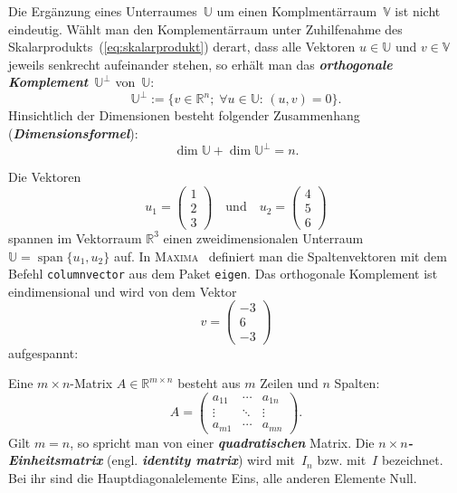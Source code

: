 \documentclass[a4paper,twoside,english,ngerman,deutsch,german,sectrefs,envcountsame,envcountchap]{svmono}
\begin{document}
Die Ergänzung eines Unterraumes~$\mathbb{U}$ um einen Komplmentärraum~$\mathbb{V}$ ist nicht eindeutig. Wählt man den Komplementärraum unter Zuhilfenahme des Skalarprodukts~(\ref{eq:skalarprodukt}) derart, dass alle Vektoren $u\in\mathbb{U}$ und $v\in\mathbb{V}$ jeweils senkrecht aufeinander stehen, so erhält man das \textbf{\em orthogonale Komplement}~$\mathbb{U}^{\perp}$ von~$\mathbb{U}$:
\begin{equation}
\mathbb{U}^{\perp}:=\{v\in{\mathbb{R}}^{n};\;\forall u\in\mathbb{U}:\,(u,v)=0\}.\label{eq:ortho-komplement}
\end{equation}
Hinsichtlich der Dimensionen besteht folgender Zusammenhang (\textbf{\em Dimensionsformel}):
\begin{equation}
\dim\mathbb{U}+\dim\mathbb{U}^{\perp}=n.\label{eq:dimensionsformel-ortho-kompl}
\end{equation}

\begin{example}
\label{exa:orthogonales-Komplement}Die Vektoren
\[
u_{1}=\left(\begin{array}{c} 1\\ 2\\ 3
\end{array}\right)\quad\text{und}\quad u_{2}=\left(\begin{array}{c}
4\\ 5\\ 6
\end{array}\right)
\]
spannen im Vektorraum ${\mathbb{R}}^{3}$ einen zweidimensionalen Unterraum $\mathbb{U}={\operatorname{span}}\{u_{1},u_{2}\}$ auf. In \textsc{Maxima}~\cite{maxima,haager2014} definiert man die Spaltenvektoren mit dem Befehl \texttt{columnvector} aus dem Paket \texttt{eigen}. Das orthogonale Komplement ist eindimensional und wird von dem Vektor
\[
v=\left(\begin{array}{c} -3\\ 6\\ -3
\end{array}\right)
\]
aufgespannt:


\end{example}

Eine $m\times n$-Matrix $A\in{\mathbb{R}}^{m\times n}$ besteht aus $m$ Zeilen und $n$ Spalten:
\[
A=\left(\begin{array}{ccc} a_{11} & \cdots & a_{1n}\\
\vdots & \ddots & \vdots\\
a_{m1} & \cdots & a_{mn}
\end{array}\right).
\]
Gilt $m=n$, so spricht man von einer \textbf{\em quadratischen} Matrix. Die $n\times n$\textbf{\em -Einheitsmatrix} (engl. \textbf{\em identity matrix}) wird mit~$I_{n}$ bzw. mit~$I$ bezeichnet. Bei ihr sind die Hauptdiagonalelemente Eins, alle anderen Elemente Null.
\end{document}
